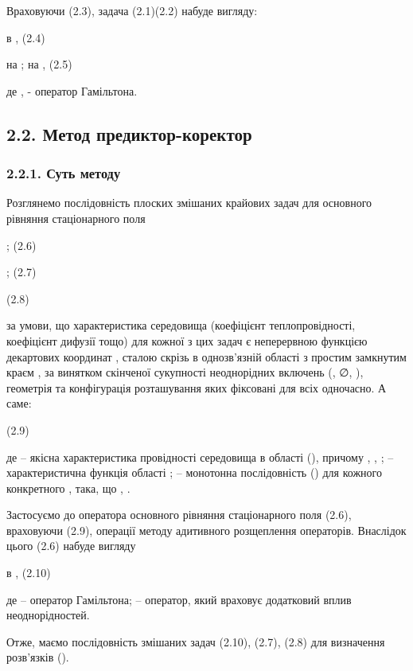 Враховуючи (2.3), задача (2.1)(2.2) набуде вигляду:

в , (2.4)

на ; на , (2.5)

де , - оператор Гамільтона.

\hypertarget{ux43cux435ux442ux43eux434-ux43fux440ux435ux434ux438ux43aux442ux43eux440-ux43aux43eux440ux435ux43aux442ux43eux440}{%
\subsection{2.2. Метод
предиктор-коректор}\label{ux43cux435ux442ux43eux434-ux43fux440ux435ux434ux438ux43aux442ux43eux440-ux43aux43eux440ux435ux43aux442ux43eux440}}

\hypertarget{ux441ux443ux442ux44c-ux43cux435ux442ux43eux434ux443}{%
\subsubsection{2.2.1. Суть
методу}\label{ux441ux443ux442ux44c-ux43cux435ux442ux43eux434ux443}}

Розглянемо послідовність плоских змішаних крайових задач для основного
рівняння стаціонарного поля

; (2.6)

; (2.7)

(2.8)

за умови, що характеристика середовища (коефіцієнт теплопровідності,
коефіцієнт дифузії тощо) для кожної з цих задач є неперервною функцією
декартових координат , сталою скрізь в однозв'язній області з простим
замкнутим краєм , за винятком скінченої сукупності неоднорідних включень
(, ∅, ), геометрія та конфігурація розташування яких фіксовані для всіх
одночасно. А саме:

(2.9)

де -- якісна характеристика провідності середовища в області (), причому
, , ; -- характеристична функція області ; -- монотонна послідовність ()
для кожного конкретного , така, що , .

Застосуємо до оператора основного рівняння стаціонарного поля (2.6),
враховуючи (2.9), операції методу адитивного розщеплення операторів.
Внаслідок цього (2.6) набуде вигляду

в , (2.10)

де -- оператор Гамільтона; -- оператор, який враховує додатковий вплив
неоднорідностей.

Отже, маємо послідовність змішаних задач (2.10), (2.7), (2.8) для
визначення розв'язків ().

